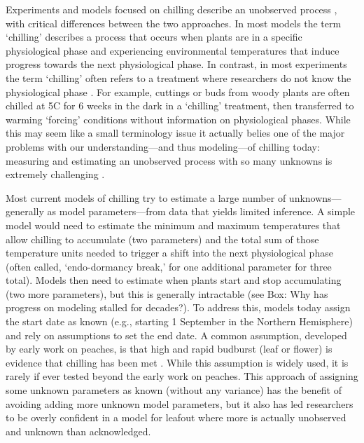 \documentclass[11pt]{article}
\begin{document}
Experiments and models focused on chilling describe an unobserved process \citep{chuine2016}, with critical differences %
between the two approaches. In most models the term `chilling' describes a process that occurs when plants are in a specific physiological phase and experiencing environmental temperatures that induce progress towards the next physiological phase. In contrast, in most experiments the term `chilling' often refers to a treatment where researchers do not know the physiological phase \citep{flynn2018,ospreebbms}. For example, cuttings or buds from woody plants are often chilled at 5\degree C for 6 weeks in the dark in a `chilling' treatment, then transferred to warming `forcing' conditions without information on physiological phases. While this may seem like a small terminology issue it actually belies one of the major problems with our understanding---and thus modeling---of chilling today: measuring and estimating an unobserved process with so many unknowns is extremely challenging \citep[][see also: Box: Why has progress on modeling stalled for decades?]{ospreebbms}. %

Most current models of chilling try to estimate a large number of unknowns---generally as model parameters---from data that yields limited inference. A simple model would need to estimate the minimum and maximum temperatures that allow chilling to accumulate (two parameters) and the total sum of those temperature units needed to trigger a shift into the next physiological phase (often called, `endo-dormancy break,' for one additional parameter for three total). Models then need to estimate  when plants start and stop accumulating (two more parameters), but this is generally intractable (see Box: Why has progress on modeling stalled for decades?). To address this, models today assign the start date as known (e.g., starting 1 September in the Northern Hemisphere) and rely on assumptions to set the end date. A common assumption, developed by early work on peaches, is that high and rapid budburst (leaf or flower) is evidence that chilling has been met \citep{erez1971}. While this assumption is widely used, it is rarely if ever tested beyond the early work on peaches. This approach of assigning some unknown parameters as known (without any variance) has the benefit of avoiding adding more unknown model parameters, but it also has led researchers to be overly confident in a model for leafout where more is actually unobserved and unknown than acknowledged. 
\end{document}
